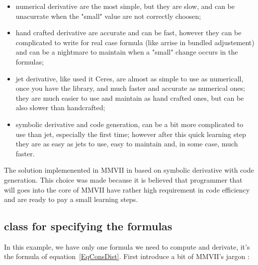 \begin{itemize}
    \item numerical derivative are the most simple, but they are slow, and can be unacurrate
          when the "small" value are not correctly choosen;

    \item hand crafted derivative are accurate and can be fast, however they can be complicated
          to write for real case formula (like arrise in bundled adjustement) and can be
          a nightmare to maintain when a "small" change occurs in the formulas;

    \item jet derivative, like used it Ceres, are almost as simple to use as numericall, once
          you have the library,  and much faster and accurate as numerical ones; they are much
          easier to use and maintain as  hand crafted ones, but can be also slower than
          handcrafted;

    \item symbolic derivative and code generation, can be a bit more complicated to use
          than jet, especially the first time; however after  this quick learning step
          they are as easy as jets to use,  easy to maintain and, in some case, much
          faster.
\end{itemize}

The solution implemenented in MMVII in based on symbolic derivative with code generation.
This choice was made because it is believed that programmer that will goes into the
core of MMVII have rather high requirement in code efficiency and are ready to pay a
small learning steps.



\subsection{class for specifying the formulas}

In this  example, we have only one formula we need to compute and derivate, it's
the formula of equation~\ref{EqConsDist}.  First introduce a bit of MMVII's jargon  :

